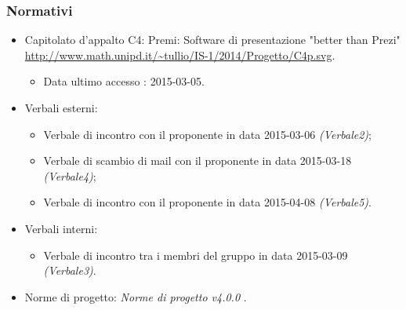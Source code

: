 \subsubsection{Normativi}
\begin{itemize}
	\item Capitolato d'appalto C4: Premi: Software di presentazione "better than Prezi"
	\newline \url{http://www.math.unipd.it/~tullio/IS-1/2014/Progetto/C4p.svg}.
	\begin{itemize}
		\item Data ultimo accesso : 2015-03-05.						
	\end{itemize}
	\item Verbali esterni:
	\begin{itemize}
		\item \gls{Verbale} di incontro con il proponente in data 2015-03-06 \textit{(Verbale2)};
		\item \gls{Verbale} di scambio di mail con il proponente in data 2015-03-18 \textit{(Verbale4)};
		\item \gls{Verbale} di incontro con il proponente in data 2015-04-08 \textit{(Verbale5)}.
	\end{itemize}
	\item Verbali interni:
	\begin{itemize}
		\item \gls{Verbale} di incontro tra i membri del gruppo in data 2015-03-09 \textit{(Verbale3)}.
	\end{itemize}
	\item Norme di progetto: \textit{Norme di progetto v4.0.0} .
\end{itemize}
